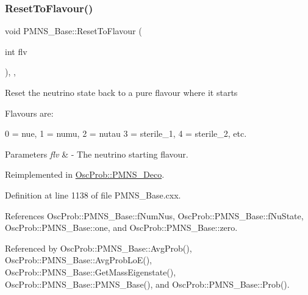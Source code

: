 \subsubsection{\texorpdfstring{Reset\+To\+Flavour()}{ResetToFlavour()}}
{\footnotesize\ttfamily void P\+M\+N\+S\+\_\+\+Base\+::\+Reset\+To\+Flavour (\begin{DoxyParamCaption}\item[{int}]{flv }\end{DoxyParamCaption})\hspace{0.3cm}{\ttfamily [protected]}, {\ttfamily [virtual]}, {\ttfamily [inherited]}}

Reset the neutrino state back to a pure flavour where it starts

Flavours are\+: 
\begin{DoxyPre}
  0 = nue, 1 = numu, 2 = nutau
  3 = sterile\_1, 4 = sterile\_2, etc.
\end{DoxyPre}
 
\begin{DoxyParams}{Parameters}
{\em flv} & -\/ The neutrino starting flavour. \\
\hline
\end{DoxyParams}


Reimplemented in \hyperlink{classOscProb_1_1PMNS__Deco_a393940f176614e3ffebeea40cfe78a62}{Osc\+Prob\+::\+P\+M\+N\+S\+\_\+\+Deco}.



Definition at line 1138 of file P\+M\+N\+S\+\_\+\+Base.\+cxx.



References Osc\+Prob\+::\+P\+M\+N\+S\+\_\+\+Base\+::f\+Num\+Nus, Osc\+Prob\+::\+P\+M\+N\+S\+\_\+\+Base\+::f\+Nu\+State, Osc\+Prob\+::\+P\+M\+N\+S\+\_\+\+Base\+::one, and Osc\+Prob\+::\+P\+M\+N\+S\+\_\+\+Base\+::zero.



Referenced by Osc\+Prob\+::\+P\+M\+N\+S\+\_\+\+Base\+::\+Avg\+Prob(), Osc\+Prob\+::\+P\+M\+N\+S\+\_\+\+Base\+::\+Avg\+Prob\+Lo\+E(), Osc\+Prob\+::\+P\+M\+N\+S\+\_\+\+Base\+::\+Get\+Mass\+Eigenstate(), Osc\+Prob\+::\+P\+M\+N\+S\+\_\+\+Base\+::\+P\+M\+N\+S\+\_\+\+Base(), and Osc\+Prob\+::\+P\+M\+N\+S\+\_\+\+Base\+::\+Prob().


